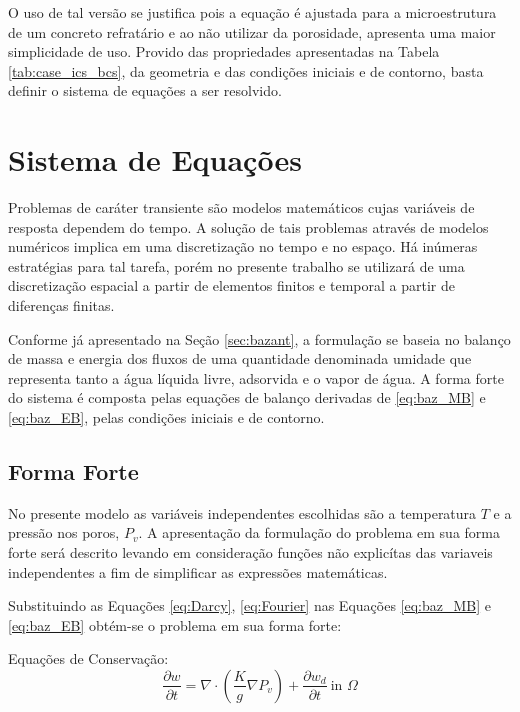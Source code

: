     O uso de tal versão se justifica pois a equação é ajustada para a
    microestrutura de um concreto refratário \cite{Gong1995a} e ao não utilizar
    da porosidade, apresenta uma maior simplicidade de uso. Provido das
    propriedades apresentadas na Tabela \ref{tab:case_ics_bcs}, da geometria e
    das condições iniciais e de contorno, basta definir o sistema de equações a
    ser resolvido.

    \section{Sistema de Equações}\label{mat:eqs}
    Problemas de caráter transiente são modelos matemáticos cujas variáveis de
    resposta dependem do tempo. A solução de tais problemas através de modelos
    numéricos implica em uma discretização no tempo e no espaço. Há inúmeras
    estratégias para tal tarefa, porém no presente trabalho se utilizará de uma
    discretização espacial a partir de elementos finitos e temporal a partir de
    diferenças finitas.

    Conforme já apresentado na Seção \ref{sec:bazant}, a formulação se baseia no
    balanço de massa e energia dos fluxos de uma quantidade denominada umidade
    que representa tanto a água líquida livre, adsorvida e o vapor de água. A
    forma forte do sistema é composta pelas equações de balanço derivadas de
    \ref{eq:baz_MB} e \ref{eq:baz_EB}, pelas condições iniciais e de contorno. 
    
    \subsection{Forma Forte}\label{mat:forte}
    No presente modelo as variáveis independentes escolhidas são a temperatura
    $T$ e a pressão nos poros, $P_v$. A apresentação da formulação do problema em
    sua forma forte será descrito levando em consideração funções não explicítas
    das variaveis independentes a fim de simplificar as expressões matemáticas.

    
    Substituindo as Equações \ref{eq:Darcy}, \ref{eq:Fourier} nas
    Equações  \ref{eq:baz_MB} e \ref{eq:baz_EB} obtém-se o problema em sua forma
    forte:  

    Equações de Conservação:
   \begin{equation}
     \label{eq:full_MB}
     \frac{\partial w}{\partial t}  = \nabla \cdot \left(\frac{K}{g} \nabla P_v \right) + \frac{\partial w_d}{\partial t} \ \text{in } \Omega
   \end{equation}

